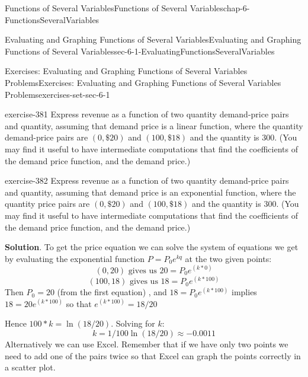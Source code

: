 \documentclass[oneside,10pt,]{book}
\numberwithin{equation}{section}
\begin{document}
\begin{chapterptx}{Functions of Several Variables}{}{Functions of Several Variables}{}{}{chap-6-FunctionsSeveralVariables}
\begin{sectionptx}{Evaluating and Graphing Functions of Several Variables}{}{Evaluating and Graphing Functions of Several Variables}{}{}{sec-6-1-EvaluatingFunctionsSeveralVariables}
\begin{exercises-subsection-numberless}{Exercises: Evaluating and Graphing Functions of Several Variables Problems}{}{Exercises: Evaluating and Graphing Functions of Several Variables Problems}{}{}{exercises-set-sec-6-1}
\begin{exercisegroup}
\begin{divisionexerciseeg}{4}{}{}{exercise-381}%
\hypertarget{p-2157}{}%
Express revenue as a function of two quantity demand-price pairs and quantity, assuming that demand price is a linear function, where the quantity demand-price pairs are \((0, \$20)\) and \((100, \$18)\) and the quantity is 300.  (You may find it useful to have intermediate computations that find the coefficients of the demand price function, and the demand price.)%
\end{divisionexerciseeg}%
\begin{divisionexerciseeg}{5}{}{}{exercise-382}%
\hypertarget{p-2158}{}%
Express revenue as a function of two quantity demand-price pairs and quantity, assuming that demand price is an exponential function, where the quantity price pairs are \((0, \$20)\) and \((100, \$18)\) and the quantity is 300.  (You may find it useful to have intermediate computations that find the coefficients of the demand price function, and the demand price.)%
\par\smallskip%
\noindent\textbf{Solution}.\hypertarget{solution-192}{}\quad%
\hypertarget{p-2159}{}%
To get the price equation we can solve the system of equations we get by evaluating the exponential function \(P=P_0  e^{kq}\) at the two given points:%
%
\begin{equation*}
(0,20)  \text{ gives us }   20=P_0  e^{(k*0)}
\end{equation*}
%
\begin{equation*}
(100,18)  \text{ gives us }   18=P_0  e^{(k*100)}
\end{equation*}
\hypertarget{p-2160}{}%
Then \(P_0=20\) (from the first equation) , and \(18=P_0  e^{(k*100)}\)  implies \(18=20 e^{(k*100)}\)  so that \(e^{(k*100)}=18/20\)%
\par
\hypertarget{p-2161}{}%
Hence \(100*k=\ln(18/20)\). Solving for \(k\):%
%
\begin{equation*}
k=1/100\ln(18/20)\approx -0.0011
\end{equation*}
\hypertarget{p-2162}{}%
Alternatively we can use Excel. Remember that if we have only two points we need to add one of the pairs twice so that Excel can graph the points correctly in a scatter plot.%
\begin{sidebyside}{1}{0.05}{0.05}{0}%
\begin{sbspanel}{0.9}%

\end{sbspanel}
\end{sidebyside}
\end{divisionexerciseeg}
\end{exercisegroup}
\end{exercises-subsection-numberless}
\end{sectionptx}
\end{chapterptx}
\end{document}
